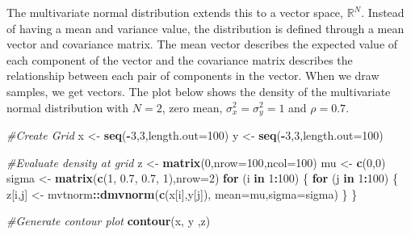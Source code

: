 \documentclass[
]{book}
\newenvironment{Shaded}{\begin{snugshade}}{\end{snugshade}}
\newcommand{\AttributeTok}[1]{\textcolor[rgb]{0.13,0.29,0.53}{#1}}
\newcommand{\CommentTok}[1]{\textcolor[rgb]{0.56,0.35,0.01}{\textit{#1}}}
\newcommand{\ControlFlowTok}[1]{\textcolor[rgb]{0.13,0.29,0.53}{\textbf{#1}}}
\newcommand{\DecValTok}[1]{\textcolor[rgb]{0.00,0.00,0.81}{#1}}
\newcommand{\FloatTok}[1]{\textcolor[rgb]{0.00,0.00,0.81}{#1}}
\newcommand{\FunctionTok}[1]{\textcolor[rgb]{0.13,0.29,0.53}{\textbf{#1}}}
\newcommand{\NormalTok}[1]{#1}
\newcommand{\OtherTok}[1]{\textcolor[rgb]{0.56,0.35,0.01}{#1}}
\newcommand{\SpecialCharTok}[1]{\textcolor[rgb]{0.81,0.36,0.00}{\textbf{#1}}}
\theoremstyle{definition}
\theoremstyle{definition}
\theoremstyle{definition}
\theoremstyle{definition}
\theoremstyle{remark}
\begin{document}
The multivariate normal distribution extends this to a vector space, \(\mathbb{R}^N\). Instead of having a mean and variance value, the distribution is defined through a mean vector and covariance matrix. The mean vector describes the expected value of each component of the vector and the covariance matrix describes the relationship between each pair of components in the vector. When we draw samples, we get vectors. The plot below shows the density of the multivariate normal distribution with \(N = 2\), zero mean, \(\sigma^2_x = \sigma^2_y = 1\) and \(\rho = 0.7\).

\begin{Shaded}
\begin{Highlighting}[]
\CommentTok{\#Create Grid}
\NormalTok{x }\OtherTok{\textless{}{-}} \FunctionTok{seq}\NormalTok{(}\SpecialCharTok{{-}}\DecValTok{3}\NormalTok{,}\DecValTok{3}\NormalTok{,}\AttributeTok{length.out=}\DecValTok{100}\NormalTok{)}
\NormalTok{y }\OtherTok{\textless{}{-}} \FunctionTok{seq}\NormalTok{(}\SpecialCharTok{{-}}\DecValTok{3}\NormalTok{,}\DecValTok{3}\NormalTok{,}\AttributeTok{length.out=}\DecValTok{100}\NormalTok{)}

\CommentTok{\#Evaluate density at grid}
\NormalTok{z }\OtherTok{\textless{}{-}} \FunctionTok{matrix}\NormalTok{(}\DecValTok{0}\NormalTok{,}\AttributeTok{nrow=}\DecValTok{100}\NormalTok{,}\AttributeTok{ncol=}\DecValTok{100}\NormalTok{)}
\NormalTok{mu }\OtherTok{\textless{}{-}} \FunctionTok{c}\NormalTok{(}\DecValTok{0}\NormalTok{,}\DecValTok{0}\NormalTok{)}
\NormalTok{sigma }\OtherTok{\textless{}{-}} \FunctionTok{matrix}\NormalTok{(}\FunctionTok{c}\NormalTok{(}\DecValTok{1}\NormalTok{, }\FloatTok{0.7}\NormalTok{, }\FloatTok{0.7}\NormalTok{, }\DecValTok{1}\NormalTok{),}\AttributeTok{nrow=}\DecValTok{2}\NormalTok{)}
\ControlFlowTok{for}\NormalTok{ (i }\ControlFlowTok{in} \DecValTok{1}\SpecialCharTok{:}\DecValTok{100}\NormalTok{) \{}
  \ControlFlowTok{for}\NormalTok{ (j }\ControlFlowTok{in} \DecValTok{1}\SpecialCharTok{:}\DecValTok{100}\NormalTok{) \{}
\NormalTok{    z[i,j] }\OtherTok{\textless{}{-}}\NormalTok{ mvtnorm}\SpecialCharTok{::}\FunctionTok{dmvnorm}\NormalTok{(}\FunctionTok{c}\NormalTok{(x[i],y[j]),}
                      \AttributeTok{mean=}\NormalTok{mu,}\AttributeTok{sigma=}\NormalTok{sigma)}
\NormalTok{  \}}
\NormalTok{\}}

\CommentTok{\#Generate contour plot}
\FunctionTok{contour}\NormalTok{(x, y ,z)}
\end{Highlighting}
\end{Shaded}
\end{document}
